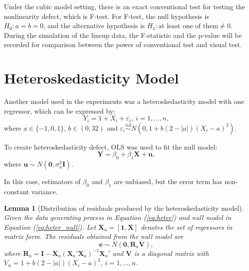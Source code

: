 \documentclass{monashthesis}
\newtheorem{lemma}{Lemma}[chapter]
\theoremstyle{definition}
\theoremstyle{definition}
\theoremstyle{definition}
\theoremstyle{definition}
\theoremstyle{remark}
\begin{document}
Under the cubic model setting, there is an exact conventional test for testing the nonlinearity defect, which is F-test. For F-test, the null hypothesis is \(H_0:a=b=0\), and the alternative hypothesis is \(H_1:\text{at least one of them} \neq 0\). During the simulation of the lineup data, the F-statistic and the p-value will be recorded for comparison between the power of conventional test and visual test.

\hypertarget{heteroskedasticity-model}{%
\section{Heteroskedasticity Model}\label{heteroskedasticity-model}}

Another model used in the experiments was a heteroskedasticity model with one regressor, which can be expressed by:
\begin{equation} \label{eq:heter}
Y_i = 1 + X_i + \varepsilon_i, ~i = 1,...,n,
\end{equation}
where \(a \in \{-1,0,1\}\), \(b\in (0,32)\) and \(\varepsilon_i \overset{iid}{\sim} N(0,1+b(2-|a|)(X_i-a)^2)\).

To create heteroskedasticity defect, OLS was used to fit the null model:
\begin{equation} \label{eq:heter_null}
\boldsymbol{Y}=\beta_0+\beta_1\boldsymbol{X}+\boldsymbol{u},
\end{equation}
where \(\boldsymbol{u} \sim N(\boldsymbol{0}, \sigma^2_u\boldsymbol{I})\).

In this case, estimators of \(\beta_0\) and \(\beta_1\) are unbiased, but the error term has non-constant variance.

\begin{lemma}[Distribution of residuals produced by the heteroskedasticity model] \label{lemma:heter}
Given the data generating process in Equation (\ref{eq:heter}) and null model in Equation (\ref{eq:heter_null}). Let $\boldsymbol{X}_a=[\boldsymbol{1},\boldsymbol{X}]$ denotes the set of regressors in matrix form. The residuals obtained from the null model are $$\boldsymbol{e} \sim N(\boldsymbol{0}, \boldsymbol{R}_a\boldsymbol{V}),$$ where $\boldsymbol{R}_a=\boldsymbol{I}-\boldsymbol{X}_a(\boldsymbol{X}_a'\boldsymbol{X}_a)^{-1}\boldsymbol{X}_a'$ and $\boldsymbol{V}$ is a diagonal matrix with $V_{ii}=1+b(2-|a|)(X_i  -  a)^2$, $i = 1,...,n$. 
\end{lemma}
\end{document}
